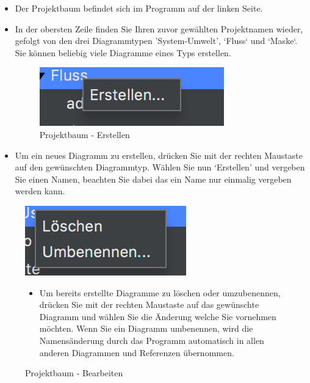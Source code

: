 \begin{itemize}
\item Der Projektbaum befindet sich im Programm auf der linken Seite.
\item In der obersten Zeile finden Sie Ihren zuvor gewählten Projektnamen wieder, gefolgt von den drei Diagrammtypen 'System-Umwelt', ‘Fluss‘ und ‘Maske‘. Sie können beliebig viele Diagramme eines Typs erstellen.

\begin{figure}[h!]
	\centering
	\includegraphics[width=.4\textwidth]{Projektbaum_Erstellen.png}
	\caption{Projektbaum - Erstellen}
\end{figure}

\item Um ein neues Diagramm zu erstellen, drücken Sie mit der rechten Maustaste auf den gewünschten Diagrammtyp. Wählen Sie nun ‘Erstellen' und vergeben Sie einen Namen, beachten Sie dabei das ein Name nur einmalig vergeben werden kann. 
\end{itemize}

\begin{figure}[h!]
	\centering
	\includegraphics[width=.4\textwidth]{Projektbaum_Bearbeiten.png}
	\caption{Projektbaum - Bearbeiten}
\begin{itemize}	
\item Um bereits erstellte Diagramme zu löschen oder umzubenennen, drücken Sie mit der rechten Maustaste auf das gewünschte Diagramm und wählen Sie die Änderung welche Sie vornehmen möchten. Wenn Sie ein Diagramm umbenennen, wird die Namensänderung durch das Programm automatisch in allen anderen Diagrammen und Referenzen übernommen.
\end{itemize}
\end{figure}

